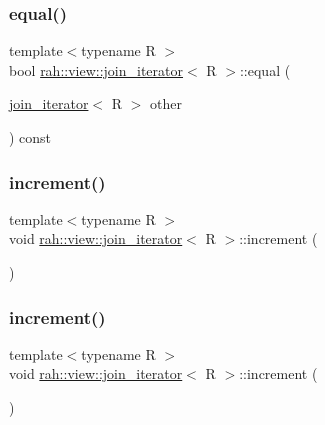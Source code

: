 \subsubsection{\texorpdfstring{equal()}{equal()}\hspace{0.1cm}{\footnotesize\ttfamily [2/2]}}
{\footnotesize\ttfamily template$<$typename R $>$ \\
bool \mbox{\hyperlink{structrah_1_1view_1_1join__iterator}{rah\+::view\+::join\+\_\+iterator}}$<$ R $>$\+::equal (\begin{DoxyParamCaption}\item[{\mbox{\hyperlink{structrah_1_1view_1_1join__iterator}{join\+\_\+iterator}}$<$ R $>$}]{other }\end{DoxyParamCaption}) const\hspace{0.3cm}{\ttfamily [inline]}}

\mbox{\label{structrah_1_1view_1_1join__iterator_a4f81464b6ff2707bb21d2bbd409c4f4d}} 
\subsubsection{\texorpdfstring{increment()}{increment()}\hspace{0.1cm}{\footnotesize\ttfamily [1/2]}}
{\footnotesize\ttfamily template$<$typename R $>$ \\
void \mbox{\hyperlink{structrah_1_1view_1_1join__iterator}{rah\+::view\+::join\+\_\+iterator}}$<$ R $>$\+::increment (\begin{DoxyParamCaption}{ }\end{DoxyParamCaption})\hspace{0.3cm}{\ttfamily [inline]}}

\mbox{\label{structrah_1_1view_1_1join__iterator_a4f81464b6ff2707bb21d2bbd409c4f4d}} 
\subsubsection{\texorpdfstring{increment()}{increment()}\hspace{0.1cm}{\footnotesize\ttfamily [2/2]}}
{\footnotesize\ttfamily template$<$typename R $>$ \\
void \mbox{\hyperlink{structrah_1_1view_1_1join__iterator}{rah\+::view\+::join\+\_\+iterator}}$<$ R $>$\+::increment (\begin{DoxyParamCaption}{ }\end{DoxyParamCaption})\hspace{0.3cm}{\ttfamily [inline]}}

